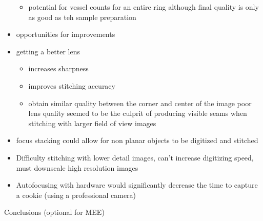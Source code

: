 \documentclass{article}
\begin{document}
\begin{outline}[itemize]
\begin{itemize}
\begin{itemize}
		\item potential for vessel counts for an entire ring 
		\subitem although final quality is only as good as teh sample preparation
		\end{itemize}
	\item opportunities for improvements
		\item getting a better lens
			\begin{itemize}
			\item increases sharpness
			\item improves stitching accuracy
			\item obtain similar quality between the corner and center of the image
			\subitem poor lens quality seemed to be the culprit of producing visible seams when stitching with larger field of view images 
			\end{itemize}

		\item focus stacking
		\subitem could allow for non planar objects to be digitized and stitched
		\item Difficulty stitching with lower detail images, can't increase digitizing speed, must downscale high resolution images 
		\item Autofocusing with hardware would significantly decrease the time to capture a cookie (using a professional camera)
	\end{itemize}
\item Conclusions (optional for MEE)

        
\end{outline}
\end{document}
